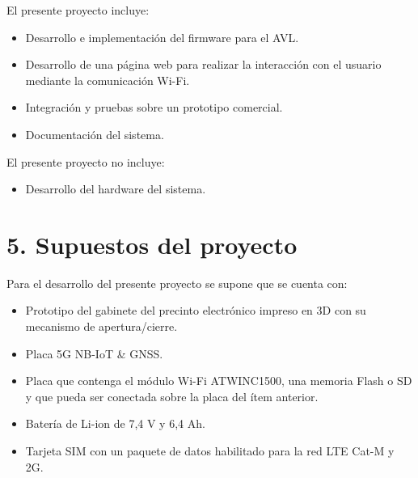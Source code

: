 \documentclass[
11pt, %
]{charter}
\begin{document}
El presente proyecto incluye:
\begin{itemize}
\item Desarrollo e implementación del firmware para el AVL.
\item Desarrollo de una página web para realizar la interacción con el usuario mediante la comunicación Wi-Fi.
\item Integración y pruebas sobre un prototipo comercial.
\item Documentación del sistema.
\end{itemize}

El presente proyecto no incluye:
\begin{itemize}
\item Desarrollo del hardware del sistema.
\end{itemize}


\section{5. Supuestos del proyecto}
\label{sec:supuestos}

Para el desarrollo del presente proyecto se supone que se cuenta con:
\begin{itemize}
	\item Prototipo del gabinete del precinto electrónico impreso en 3D con su mecanismo de apertura/cierre.
	\item Placa 5G NB-IoT \& GNSS.
	\item Placa que contenga el módulo Wi-Fi ATWINC1500, una memoria Flash o SD y que pueda ser conectada sobre la placa del ítem anterior.
	\item Batería de Li-ion de 7,4 V y 6,4 Ah. 
	\item Tarjeta SIM con un paquete de datos habilitado para la red LTE Cat-M y 2G.
\end{itemize}

%
%
\end{document}
